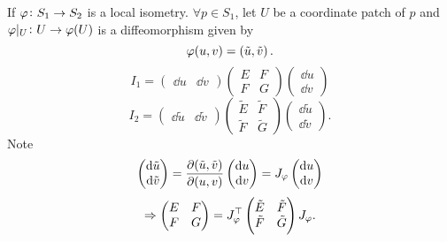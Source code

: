 \begin{remark}
    If \(\varphi\colon S_1\to S_2\) is a local isometry.
    \(\forall p\in S_1\), let \(U\) be a coordinate patch of 
    \(p\) and \(\varphi|_U\colon U\to \varphi(U)\) is a diffeomorphism 
    given by 
    \[
        \varphi(u,v)=\left(\tilde{u},\tilde{v}\right).    
    \]
    \[
        I_1=\begin{pmatrix}
            \dd u& \dd v
        \end{pmatrix}
        \begin{pmatrix}
            E&F\\
            F&G
        \end{pmatrix}
        \begin{pmatrix}
            \dd u\\
            \dd v
        \end{pmatrix}
    \]
    \[
        I_2=\begin{pmatrix}
            \dd \tilde{u}& \dd \tilde{v}
        \end{pmatrix}
        \begin{pmatrix}
            \tilde{E}&\tilde{F}\\
            \tilde{F}&\tilde{G}
        \end{pmatrix}
        \begin{pmatrix}
            \dd \tilde{u}\\
            \dd \tilde{v}
        \end{pmatrix}.
    \]
    Note 
    \[
        \begin{pmatrix}
            \dd \tilde{u}\\
            \dd \tilde{v}
        \end{pmatrix}
        =
        \pdv{(\tilde{u},\tilde{v})}{(u,v)}
        \begin{pmatrix}
            \dd u\\
            \dd v
        \end{pmatrix}
        =
        J_\varphi 
        \begin{pmatrix}
            \dd u\\
            \dd v
        \end{pmatrix}    
    \]
    \[
        \Rightarrow 
        \begin{pmatrix}
            E&F\\
            F&G
        \end{pmatrix}=
        J_\varphi^\top \begin{pmatrix}
            \tilde{E}&\tilde{F}\\
            \tilde{F}&\tilde{G}
        \end{pmatrix} J_\varphi. 
    \]
\end{remark}